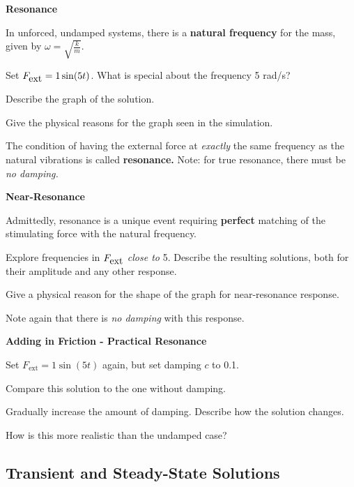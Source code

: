 {\bf Resonance}

In unforced, undamped systems, there is a {\bf natural frequency} for
the mass, given by $\omega = \sqrt{\frac{k}{m}}$.

\problem Set $F_{\mbox{ext}} = 1 \sin(5t)$.  What is special about the frequency
5 rad/s?

\vfill

Describe the graph of the solution.

\vfill

\newpage

Give the physical reasons for the graph seen in the
simulation.\\

\vfill

The condition of having the external force at {\em exactly} the same
frequency as the natural vibrations is called {\bf resonance.}  Note:
for true resonance, there must be {\em no damping.}

\newpage

{\bf Near-Resonance}

Admittedly, resonance is a unique event requiring {\bf perfect}
matching of the stimulating force with the natural frequency.

\problem Explore frequencies in $F_{\mbox{ext}}$ {\em close to} 5.  Describe the
resulting solutions, both for their amplitude and any other response.

\vfill

Give a physical reason for the shape of the graph for near-resonance
response.

\vfill

Note again that there is {\em no damping} with this response.

\newpage

{\bf Adding in Friction - Practical Resonance}

Set $F_{\mbox{ext}} = 1 \sin(5t)$ again, but set damping $c$ to 0.1.

\problem Compare this solution to the one without damping.

\vfill

Gradually increase the amount of damping.  Describe how the solution
changes.

\vfill

How is this more realistic than the undamped case?

\vfill

\newpage

\subsection*{Transient and Steady-State Solutions}

